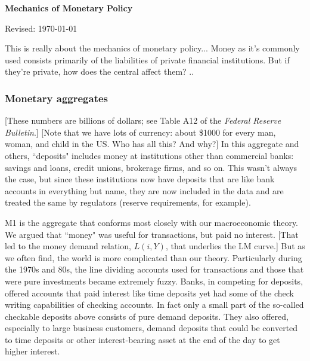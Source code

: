 \documentclass[letterpaper,12pt]{article}
\def\HeadName{Mechanics of Monetary Policy}
\begin{document}
\thispagestyle{empty}%
\Head

\centerline{\large \bf \HeadName}%
\centerline{Revised: \today}

\bigskip
This is really about the mechanics of monetary policy...
Money as it's commonly used consists primarily of the liabilities of private financial institutions.
But if they're private, how does the central affect them?  ..


\subsubsection*{Monetary aggregates} 

%
[These numbers are billions of dollars; see Table A12 of the {\em Federal Reserve Bulletin}.]
[Note that we have lots of currency:  about \$1000 for every man, woman, and child in the US.  Who
has all this?  And why?]  In this aggregate and others, ``deposits" includes money at institutions
other than commercial banks:  savings and loans, credit unions, brokerage firms, and so on.  This
wasn't always the case, but since these institutions now have deposits that are like bank accounts
in everything but name, they are now included in the data and are treated the same by regulators
(reserve requirements, for example).

     M1 is the aggregate that conforms most closely with our macroeconomic
theory.  We argued that ``money" was useful for transactions, but paid no interest.  [That led to
the money demand relation, $L(i,Y)$, that underlies the LM curve.]  But as we often find, the
world is more complicated than our theory.  Particularly during the 1970s and 80s, the line
dividing accounts used for transactions and those that were pure investments became extremely
fuzzy.  Banks, in competing for deposits, offered accounts that paid interest like time deposits
yet had some of the check writing capabilities of checking accounts.  In fact only a small part of
the so-called checkable deposits above consists of pure demand deposits.  They also offered,
especially to large business customers, demand deposits that could be converted to time deposits
or other interest-bearing asset at the end of the day to get higher interest.
\end{document}
